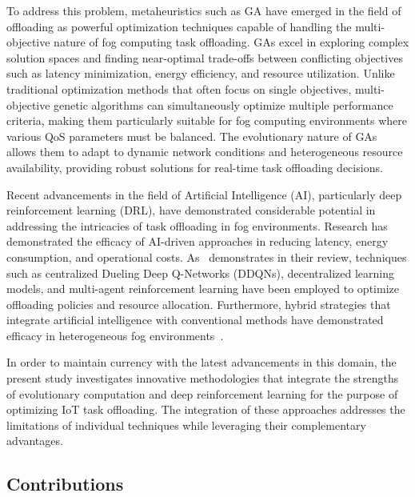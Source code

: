 \documentclass{svproc}
\begin{document}
To address this problem, metaheuristics such as GA have emerged in the field of offloading as powerful optimization techniques capable of handling the multi-objective nature of fog computing task offloading. GAs excel in exploring complex solution spaces and finding near-optimal trade-offs between conflicting objectives such as latency minimization, energy efficiency, and resource utilization. Unlike traditional optimization methods that often focus on single objectives, multi-objective genetic algorithms can simultaneously optimize multiple performance criteria, making them particularly suitable for fog computing environments where various QoS parameters must be balanced. The evolutionary nature of GAs allows them to adapt to dynamic network conditions and heterogeneous resource availability, providing robust solutions for real-time task offloading decisions.

Recent advancements in the field of Artificial Intelligence (AI), particularly deep reinforcement learning (DRL), have demonstrated considerable potential in addressing the intricacies of task offloading in fog environments. Research has demonstrated the efficacy of AI-driven approaches in reducing latency, energy consumption, and operational costs. As~\cite{fahimullah_review_2022} demonstrates in their review, techniques such as centralized Dueling Deep Q-Networks (DDQNs), decentralized learning models, and multi-agent reinforcement learning have been employed to optimize offloading policies and resource allocation. Furthermore, hybrid strategies that integrate artificial intelligence with conventional methods have demonstrated efficacy in heterogeneous fog environments~\cite{mishra_collaborative_2023}.

In order to maintain currency with the latest advancements in this domain, the present study investigates innovative methodologies that integrate the strengths of evolutionary computation and deep reinforcement learning for the purpose of optimizing IoT task offloading. The integration of these approaches addresses the limitations of individual techniques while leveraging their complementary advantages.


\subsection{Contributions}
\end{document}
